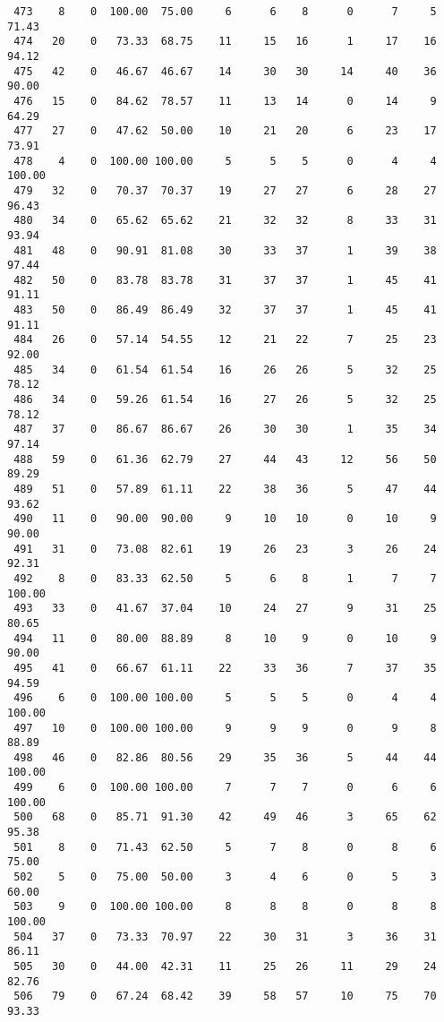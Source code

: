 \begin{verbatim}
 473    8    0  100.00  75.00     6      6    8      0      7     5    71.43
 474   20    0   73.33  68.75    11     15   16      1     17    16    94.12
 475   42    0   46.67  46.67    14     30   30     14     40    36    90.00
 476   15    0   84.62  78.57    11     13   14      0     14     9    64.29
 477   27    0   47.62  50.00    10     21   20      6     23    17    73.91
 478    4    0  100.00 100.00     5      5    5      0      4     4   100.00
 479   32    0   70.37  70.37    19     27   27      6     28    27    96.43
 480   34    0   65.62  65.62    21     32   32      8     33    31    93.94
 481   48    0   90.91  81.08    30     33   37      1     39    38    97.44
 482   50    0   83.78  83.78    31     37   37      1     45    41    91.11
 483   50    0   86.49  86.49    32     37   37      1     45    41    91.11
 484   26    0   57.14  54.55    12     21   22      7     25    23    92.00
 485   34    0   61.54  61.54    16     26   26      5     32    25    78.12
 486   34    0   59.26  61.54    16     27   26      5     32    25    78.12
 487   37    0   86.67  86.67    26     30   30      1     35    34    97.14
 488   59    0   61.36  62.79    27     44   43     12     56    50    89.29
 489   51    0   57.89  61.11    22     38   36      5     47    44    93.62
 490   11    0   90.00  90.00     9     10   10      0     10     9    90.00
 491   31    0   73.08  82.61    19     26   23      3     26    24    92.31
 492    8    0   83.33  62.50     5      6    8      1      7     7   100.00
 493   33    0   41.67  37.04    10     24   27      9     31    25    80.65
 494   11    0   80.00  88.89     8     10    9      0     10     9    90.00
 495   41    0   66.67  61.11    22     33   36      7     37    35    94.59
 496    6    0  100.00 100.00     5      5    5      0      4     4   100.00
 497   10    0  100.00 100.00     9      9    9      0      9     8    88.89
 498   46    0   82.86  80.56    29     35   36      5     44    44   100.00
 499    6    0  100.00 100.00     7      7    7      0      6     6   100.00
 500   68    0   85.71  91.30    42     49   46      3     65    62    95.38
 501    8    0   71.43  62.50     5      7    8      0      8     6    75.00
 502    5    0   75.00  50.00     3      4    6      0      5     3    60.00
 503    9    0  100.00 100.00     8      8    8      0      8     8   100.00
 504   37    0   73.33  70.97    22     30   31      3     36    31    86.11
 505   30    0   44.00  42.31    11     25   26     11     29    24    82.76
 506   79    0   67.24  68.42    39     58   57     10     75    70    93.33

\end{verbatim}
